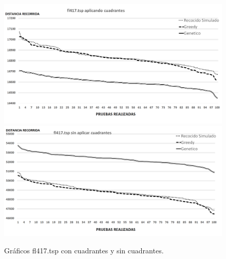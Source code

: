  \begin{figure}[hbtp]
    \centering
        \includegraphics[width=1\textwidth]{PruebasResultados/Experimentos_Graficos_Con/fl417.png}
        \includegraphics[width=1\textwidth]{PruebasResultados/Experimentos_Graficos_Sin/fl417.png}
        \caption{Gráficos fl417.tsp con cuadrantes y sin cuadrantes.}
        \label{fig:fl417_grafica.png}
\end{figure}
\newpage


